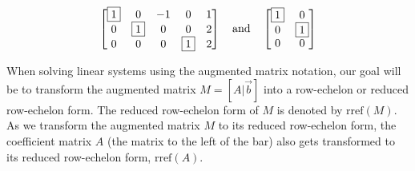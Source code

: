 \documentclass{ximera}
\begin{document}
$$\begin{bmatrix}  
 \fbox{1}&0&-1&0&1\\0&\fbox{1}&0&0&2\\0&0&0&\fbox{1}&2
 \end{bmatrix}\quad\text{and}\quad\begin{bmatrix}
 \fbox{1}&0\\0&\fbox{1}\\0&0
 \end{bmatrix}$$
 
 When solving linear systems using the augmented matrix notation, our goal will be to transform the augmented matrix $M=[A|\vec{b}]$ into a row-echelon or reduced row-echelon form.  The reduced row-echelon form of $M$ is denoted by 
$\mbox{rref}(M)$.  As we transform the augmented matrix $M$ to its reduced row-echelon form, the coefficient matrix $A$ (the matrix to the left of the bar) also gets transformed to its reduced row-echelon form, $\mbox{rref}(A)$. 
\end{document}
